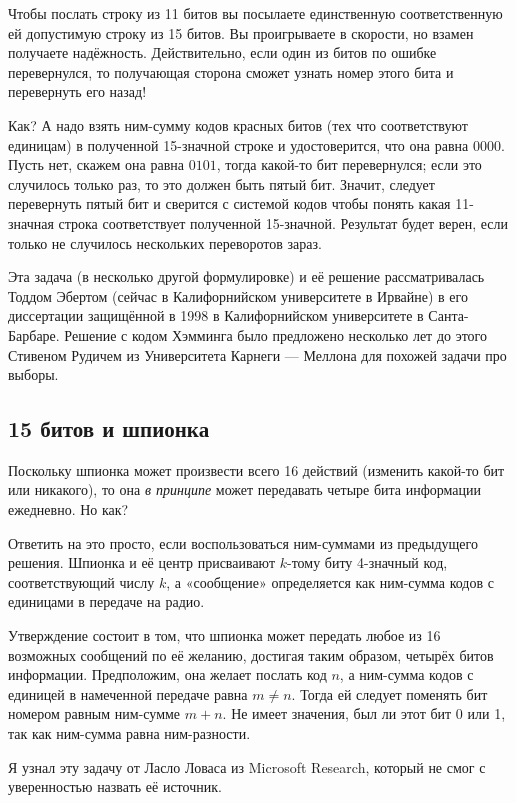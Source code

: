 Чтобы послать строку из 11 битов вы посылаете единственную соответственную ей допустимую строку из 15 битов.
Вы проигрываете в скорости, но взамен получаете надёжность.
Действительно, если один из битов по ошибке перевернулся, то получающая сторона сможет узнать номер этого бита и перевернуть его назад!

Как? А надо взять ним-сумму кодов красных битов (тех что соответствуют единицам) в полученной 15-значной строке и удостоверится, что она равна $0000$.
Пусть нет, скажем она равна $0101$,
тогда какой-то бит перевернулся;
если это случилось только раз, то это должен быть пятый бит.
Значит, следует перевернуть пятый бит и сверится с системой кодов чтобы понять какая 11-значная строка соответствует полученной 15-значной.
Результат будет верен, если только не случилось нескольких переворотов зараз.

\medskip

Эта задача (в несколько другой формулировке) и её решение рассматривалась Тоддом Эбертом (сейчас в Калифорнийском университете в Ирвайне) в его диссертации защищённой в 1998 в Калифорнийском университете в Санта-Барбаре.
Решение с кодом Хэмминга было предложено несколько лет до этого Стивеном Рудичем из Университета Карнеги — Меллона  для похожей задачи про выборы.

\subsection*{15 битов и шпионка}

Поскольку шпионка может произвести всего 16 действий (изменить какой-то бит или никакого), то она \emph{в принципе} может передавать четыре бита информации ежедневно.
Но как?

Ответить на это просто, если воспользоваться ним-суммами из предыдущего решения.
Шпионка и её центр присваивают $k$-тому биту 4-значный код, соответствующий числу $k$, а «сообщение» определяется как ним-сумма кодов с единицами в передаче на радио.

Утверждение состоит в том, что шпионка может передать любое из 16 возможных сообщений по её желанию,
достигая таким образом, четырёх битов информации.
Предположим, она желает послать код $n$, а ним-сумма кодов с единицей в намеченной передаче равна $m\ne n$.
Тогда ей следует поменять бит номером равным ним-сумме $m+n$.
Не имеет значения, был ли этот бит 0 или 1, так как ним-сумма равна ним-разности.
\heart

\medskip

Я узнал эту задачу от Ласло Ловаса из Microsoft Research, который не смог с уверенностью назвать её источник.

